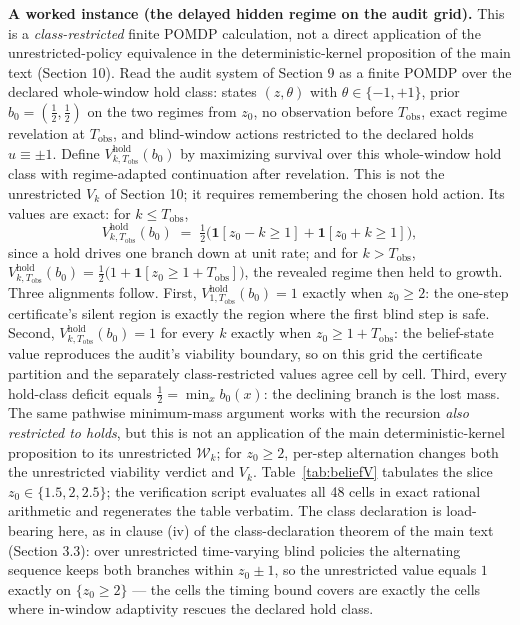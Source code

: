 \documentclass[11pt]{article}
\theoremstyle{definition}
\begin{document}
\textbf{A worked instance (the delayed hidden regime on the audit grid).} This is a \emph{class-restricted} finite POMDP calculation, not a direct application of the unrestricted-policy equivalence in the deterministic-kernel proposition of the main text (Section 10). Read the audit system of Section 9 as a finite POMDP over the declared whole-window hold class: states \((z,\theta)\) with \(\theta \in \{-1,+1\}\), prior \(b_{0} = (\tfrac{1}{2}, \tfrac{1}{2})\) on the two regimes from \(z_{0}\), no observation before \(T_{\mathrm{obs}}\), exact regime revelation at \(T_{\mathrm{obs}}\), and blind-window actions restricted to the declared holds \(u \equiv \pm 1\). Define \(V^{\mathrm{hold}}_{k,T_{\mathrm{obs}}}(b_0)\) by maximizing survival over this whole-window hold class with regime-adapted continuation after revelation. This is not the unrestricted \(V_k\) of Section 10; it requires remembering the chosen hold action. Its values are exact: for \(k \le T_{\mathrm{obs}}\),
\[
V^{\mathrm{hold}}_{k,T_{\mathrm{obs}}}(b_{0}) \;=\; \tfrac{1}{2}\bigl(\mathbf{1}[z_{0} - k \ge 1] + \mathbf{1}[z_{0} + k \ge 1]\bigr),
\]
since a hold drives one branch down at unit rate; and for \(k > T_{\mathrm{obs}}\),
\(V^{\mathrm{hold}}_{k,T_{\mathrm{obs}}}(b_{0}) = \tfrac{1}{2}\bigl(1 + \mathbf{1}[z_{0} \ge 1 + T_{\mathrm{obs}}]\bigr)\), the revealed regime then held to growth. Three alignments follow. First, \(V^{\mathrm{hold}}_{1,T_{\mathrm{obs}}}(b_{0}) = 1\) exactly when \(z_{0} \ge 2\): the one-step certificate's silent region is exactly the region where the first blind step is safe. Second, \(V^{\mathrm{hold}}_{k,T_{\mathrm{obs}}}(b_{0}) = 1\) for every \(k\) exactly when \(z_{0} \ge 1 + T_{\mathrm{obs}}\): the belief-state value reproduces the audit's viability boundary, so on this grid the certificate partition and the separately class-restricted values agree cell by cell. Third, every hold-class deficit equals \(\tfrac{1}{2}=\min_x b_0(x)\): the declining branch is the lost mass. The same pathwise minimum-mass argument works with the recursion \emph{also restricted to holds}, but this is not an application of the main deterministic-kernel proposition to its unrestricted \(\mathcal W_k\); for \(z_0\ge2\), per-step alternation changes both the unrestricted viability verdict and \(V_k\). Table~\ref{tab:beliefV} tabulates the slice \(z_{0} \in \{1.5, 2, 2.5\}\); the verification script evaluates all 48 cells in exact rational arithmetic and regenerates the table verbatim. The class declaration is load-bearing here, as in clause (iv) of the class-declaration theorem of the main text (Section 3.3): over unrestricted time-varying blind policies the alternating sequence keeps both branches within \(z_{0} \pm 1\), so the unrestricted value equals \(1\) exactly on \(\{z_{0} \ge 2\}\) --- the cells the timing bound covers are exactly the cells where in-window adaptivity rescues the declared hold class.
\end{document}
